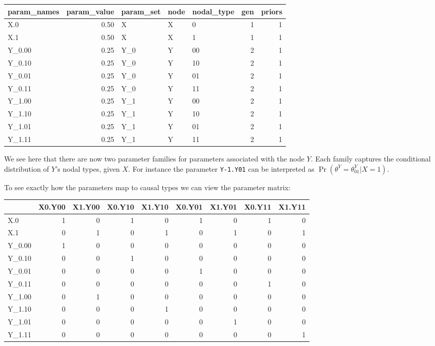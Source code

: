 \documentclass[
  12pt,
]{book}
\newenvironment{Shaded}{\begin{snugshade}}{\end{snugshade}}
\newcommand{\KeywordTok}[1]{\textcolor[rgb]{0.13,0.29,0.53}{\textbf{#1}}}
\newcommand{\NormalTok}[1]{#1}
\newcommand{\OperatorTok}[1]{\textcolor[rgb]{0.81,0.36,0.00}{\textbf{#1}}}
\newcommand{\StringTok}[1]{\textcolor[rgb]{0.31,0.60,0.02}{#1}}
\begin{document}
\begin{tabular}{l|r|l|l|l|r|r}
\hline
param\_names & param\_value & param\_set & node & nodal\_type & gen & priors\\
\hline
X.0 & 0.50 & X & X & 0 & 1 & 1\\
\hline
X.1 & 0.50 & X & X & 1 & 1 & 1\\
\hline
Y\_0.00 & 0.25 & Y\_0 & Y & 00 & 2 & 1\\
\hline
Y\_0.10 & 0.25 & Y\_0 & Y & 10 & 2 & 1\\
\hline
Y\_0.01 & 0.25 & Y\_0 & Y & 01 & 2 & 1\\
\hline
Y\_0.11 & 0.25 & Y\_0 & Y & 11 & 2 & 1\\
\hline
Y\_1.00 & 0.25 & Y\_1 & Y & 00 & 2 & 1\\
\hline
Y\_1.10 & 0.25 & Y\_1 & Y & 10 & 2 & 1\\
\hline
Y\_1.01 & 0.25 & Y\_1 & Y & 01 & 2 & 1\\
\hline
Y\_1.11 & 0.25 & Y\_1 & Y & 11 & 2 & 1\\
\hline
\end{tabular}

We see here that there are now two parameter families for parameters associated with the node \(Y\). Each family captures the conditional distribution of \(Y\)'s nodal types, given \(X\). For instance the parameter \texttt{Y-1.Y01} can be interpreted as \(\Pr(\theta^Y = \theta^Y _{01} | X=1)\).

To see exactly how the parameters map to causal types we can view the parameter matrix:

\begin{Shaded}
\end{Shaded}

\begin{tabular}{l|r|r|r|r|r|r|r|r}
\hline
  & X0.Y00 & X1.Y00 & X0.Y10 & X1.Y10 & X0.Y01 & X1.Y01 & X0.Y11 & X1.Y11\\
\hline
X.0 & 1 & 0 & 1 & 0 & 1 & 0 & 1 & 0\\
\hline
X.1 & 0 & 1 & 0 & 1 & 0 & 1 & 0 & 1\\
\hline
Y\_0.00 & 1 & 0 & 0 & 0 & 0 & 0 & 0 & 0\\
\hline
Y\_0.10 & 0 & 0 & 1 & 0 & 0 & 0 & 0 & 0\\
\hline
Y\_0.01 & 0 & 0 & 0 & 0 & 1 & 0 & 0 & 0\\
\hline
Y\_0.11 & 0 & 0 & 0 & 0 & 0 & 0 & 1 & 0\\
\hline
Y\_1.00 & 0 & 1 & 0 & 0 & 0 & 0 & 0 & 0\\
\hline
Y\_1.10 & 0 & 0 & 0 & 1 & 0 & 0 & 0 & 0\\
\hline
Y\_1.01 & 0 & 0 & 0 & 0 & 0 & 1 & 0 & 0\\
\hline
Y\_1.11 & 0 & 0 & 0 & 0 & 0 & 0 & 0 & 1\\
\hline
\end{tabular}
\end{document}
